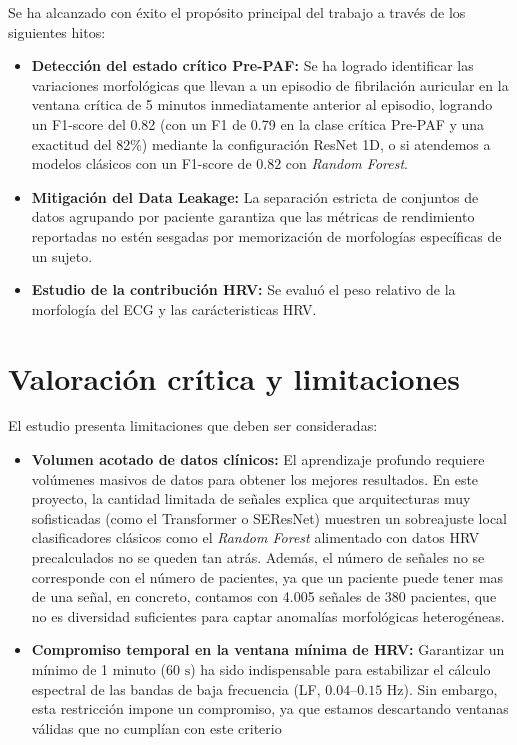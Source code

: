 Se ha alcanzado con éxito el propósito principal del trabajo a través de los siguientes hitos:
\begin{itemize}
  \item \textbf{Detección del estado crítico Pre-PAF:} Se ha logrado identificar las variaciones morfológicas
  que llevan a un episodio de fibrilación auricular en la ventana crítica de 5 minutos inmediatamente anterior al episodio, logrando un
  F1-score del 0.82 (con un F1 de 0.79 en la clase crítica Pre-PAF y una exactitud del 82\%) mediante la configuración ResNet 1D, o si atendemos a modelos clásicos
  con un F1-score de $0.82$ con \textit{Random Forest}.
  \item \textbf{Mitigación del Data Leakage:} La separación estricta de conjuntos de datos agrupando
  por paciente garantiza que las métricas de rendimiento reportadas no estén
  sesgadas por memorización de morfologías específicas de un sujeto.
  \item \textbf{Estudio de la contribución HRV:} Se evaluó el peso relativo de la morfología del ECG y las carácteristicas HRV.
\end{itemize}

\section{Valoración crítica y limitaciones}
\label{sec:valoracion_critica}

El estudio presenta limitaciones que deben ser consideradas:
\begin{itemize}
  \item \textbf{Volumen acotado de datos clínicos:}
  El aprendizaje profundo requiere volúmenes masivos de datos para obtener los mejores resultados.
  En este proyecto, la cantidad limitada de señales
  explica que arquitecturas muy sofisticadas (como el Transformer o SEResNet) muestren un sobreajuste
  local  clasificadores clásicos como el
  \textit{Random Forest} alimentado con datos HRV precalculados no se queden tan atrás. Además, el número de señales
  no se corresponde con el número de pacientes, ya que un paciente puede tener mas de una señal, en concreto, contamos 
  con 4.005 señales de 380 pacientes, que no es diversidad suficientes para captar anomalías morfológicas heterogéneas.

  \item \textbf{Compromiso temporal en la ventana mínima de HRV:}
  Garantizar un mínimo de 1 minuto ($60\text{ s}$) ha sido indispensable para estabilizar el cálculo espectral de
  las bandas de baja frecuencia (LF, $0.04\text{--}0.15\text{ Hz}$). Sin embargo, esta
  restricción impone un compromiso, ya que estamos descartando ventanas válidas que no cumplían con este criterio

\end{itemize}

